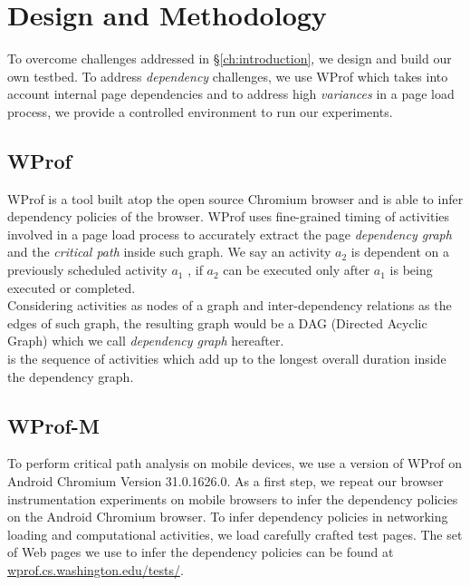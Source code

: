 \chapter{Design and Methodology}\label{ch:methodology}
To overcome challenges addressed in \S\ref{ch:introduction}, we design and build our own testbed.
To address {\em dependency} challenges, we use WProf \cite{wprof} which takes into account internal page dependencies and to address high {\em variances} in a page load process, we provide a controlled environment to run our experiments.
\section{WProf}
WProf is a tool built atop the open source Chromium browser and is able to infer dependency policies of the browser. 
WProf uses fine-grained timing of activities involved in a page load process to accurately extract the page {\em dependency graph} and the {\em critical path} inside such graph.
We say an activity $a_2$ is dependent on a previously scheduled activity $a_1$ , if $a_2$ can be executed only after $a_1$ is being executed or completed. \\
Considering activities as nodes of a graph  and inter-dependency relations as the edges of such graph, the resulting graph would be a DAG (Directed Acyclic Graph) which we call {\em dependency graph} hereafter.\\

 is the sequence of activities which add up to the longest overall duration inside the dependency graph.\\

\section{WProf-M} To perform critical path analysis on mobile devices, we use a version of WProf on Android Chromium Version 31.0.1626.0. As a first step, we repeat our browser instrumentation experiments on mobile browsers to infer the dependency policies on the Android Chromium browser. To infer dependency policies in networking loading and computational activities, we load carefully crafted test pages. The set of Web pages we use to infer the dependency policies can be found at \url{wprof.cs.washington.edu/tests/}. \\

